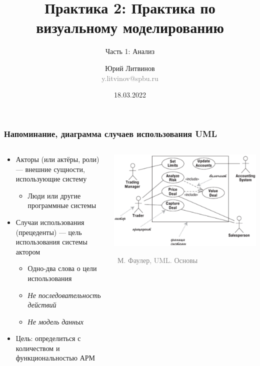 \documentclass[xetex,mathserif,serif]{beamer}
\title{Практика 2: Практика по визуальному моделированию}
\subtitle{Часть 1: Анализ}
\author[Юрий Литвинов]{Юрий Литвинов\\\small{\textcolor{gray}{y.litvinov@spbu.ru}}}
\date{18.03.2022}
\newcommand{\attribution}[1] {
    \vspace{-5mm}\begin{flushright}\begin{scriptsize}\textcolor{gray}{\textcopyright\, #1}\end{scriptsize}\end{flushright}
}
\begin{document}
    \frame{\titlepage}

    \begin{frame}
        \frametitle{Напоминание, диаграмма случаев использования UML}
        \begin{columns}
            \begin{column}{0.6\textwidth}
                \begin{itemize}
                    \item Акторы (или актёры, роли) --- внешние сущности, использующие систему
                    \begin{itemize}
                        \item Люди или другие программные системы
                    \end{itemize}
                    \item Случаи использования (прецеденты)  --- цель использования системы актором
                    \begin{itemize}
                        \item Одно-два слова о цели использования
                        \item \textit{Не последовательность действий}
                        \item \textit{Не модель данных}
                    \end{itemize}
                    \item Цель: определиться с количеством и функциональностью АРМ
                \end{itemize}
            \end{column}
            \begin{column}{0.4\textwidth}
                \begin{center}
                    \includegraphics[width=\textwidth]{useCaseDiagram.png}
                    \attribution{М. Фаулер, UML. Основы}
                \end{center}
            \end{column}
        \end{columns}
    \end{frame}
\end{document}
